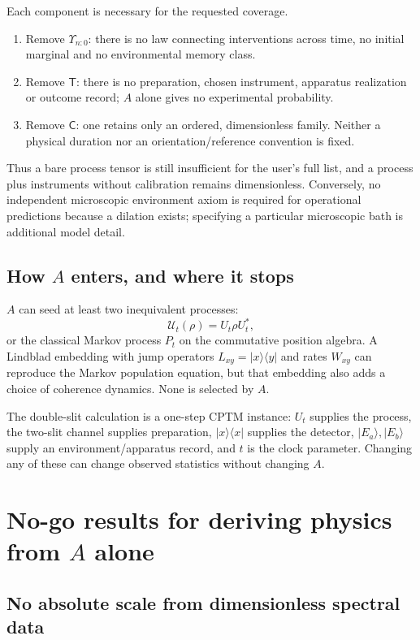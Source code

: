 \documentclass[11pt,a4paper]{article}
\theoremstyle{definition}
\theoremstyle{remark}
\begin{document}
Each component is necessary for the requested coverage.

\begin{enumerate}
\item Remove $\Upsilon_{n:0}$: there is no law connecting interventions across time, no initial marginal and no environmental memory class.
\item Remove $\mathsf T$: there is no preparation, chosen instrument, apparatus realization or outcome record; $A$ alone gives no experimental probability.
\item Remove $\mathsf C$: one retains only an ordered, dimensionless family. Neither a physical duration nor an orientation/reference convention is fixed.
\end{enumerate}

Thus a bare process tensor is still insufficient for the user's full list, and a process plus instruments without calibration remains dimensionless. Conversely, no independent microscopic environment axiom is required for operational predictions because a dilation exists; specifying a particular microscopic bath is additional model detail.

\subsection{How $A$ enters, and where it stops}

$A$ can seed at least two inequivalent processes:
\[
 \mathcal U_t(\rho)=U_t\rho U_t^*,
\]
or the classical Markov process $P_t$ on the commutative position algebra. A Lindblad embedding with jump operators $L_{xy}=|x\rangle\langle y|$ and rates $W_{xy}$ can reproduce the Markov population equation, but that embedding also adds a choice of coherence dynamics. None is selected by $A$.

The double-slit calculation is a one-step CPTM instance: $U_t$ supplies the process, the two-slit channel supplies preparation, $|x\rangle\langle x|$ supplies the detector, $|E_a\rangle,|E_b\rangle$ supply an environment/apparatus record, and $t$ is the clock parameter. Changing any of these can change observed statistics without changing $A$.

\section{No-go results for deriving physics from $A$ alone}

\subsection{No absolute scale from dimensionless spectral data}
\end{document}
